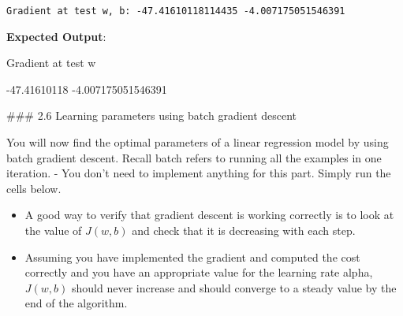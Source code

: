 \documentclass[11pt]{article}
\begin{document}
    \begin{Verbatim}[commandchars=\\\{\}]
Gradient at test w, b: -47.41610118114435 -4.007175051546391
    \end{Verbatim}

    \textbf{Expected Output}:

Gradient at test w

-47.41610118 -4.007175051546391

    \#\#\# 2.6 Learning parameters using batch gradient descent

You will now find the optimal parameters of a linear regression model by
using batch gradient descent. Recall batch refers to running all the
examples in one iteration. - You don't need to implement anything for
this part. Simply run the cells below.

\begin{itemize}
\item
  A good way to verify that gradient descent is working correctly is to
  look at the value of \(J(w,b)\) and check that it is decreasing with
  each step.
\item
  Assuming you have implemented the gradient and computed the cost
  correctly and you have an appropriate value for the learning rate
  alpha, \(J(w,b)\) should never increase and should converge to a
  steady value by the end of the algorithm.
\end{itemize}
\end{document}
